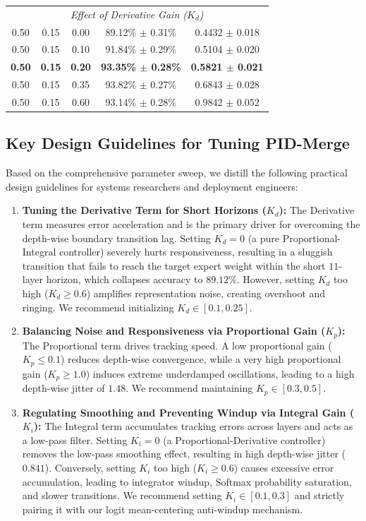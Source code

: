 \begin{table}[h]
\begin{center}
\begin{small}
\begin{sc}
\begin{tabular}{ccccc}
\midrule
\multicolumn{5}{c}{\textit{Effect of Derivative Gain ($K_d$)}} \\
0.50 & 0.15 & 0.00 & 89.12\% $\pm$ 0.31\% & 0.4432 $\pm$ 0.018 \\
0.50 & 0.15 & 0.10 & 91.84\% $\pm$ 0.29\% & 0.5104 $\pm$ 0.020 \\
\textbf{0.50} & \textbf{0.15} & \textbf{0.20} & \textbf{93.35\% $\pm$ 0.28\%} & \textbf{0.5821 $\pm$ 0.021} \\
0.50 & 0.15 & 0.35 & 93.82\% $\pm$ 0.27\% & 0.6843 $\pm$ 0.028 \\
0.50 & 0.15 & 0.60 & 93.14\% $\pm$ 0.28\% & 0.9842 $\pm$ 0.052 \\
\bottomrule
\end{tabular}
\end{sc}
\end{small}
\end{center}
\vskip -0.1in
\end{table}

\subsection{Key Design Guidelines for Tuning PID-Merge}
Based on the comprehensive parameter sweep, we distill the following practical design guidelines for systems researchers and deployment engineers:
\begin{enumerate}
    \item \textbf{Tuning the Derivative Term for Short Horizons ($K_d$):} The Derivative term measures error acceleration and is the primary driver for overcoming the depth-wise boundary transition lag. Setting $K_d = 0$ (a pure Proportional-Integral controller) severely hurts responsiveness, resulting in a sluggish transition that fails to reach the target expert weight within the short $11$-layer horizon, which collapses accuracy to $89.12\%$. However, setting $K_d$ too high ($K_d \ge 0.6$) amplifies representation noise, creating overshoot and ringing. We recommend initializing $K_d \in [0.1, 0.25]$.
    \item \textbf{Balancing Noise and Responsiveness via Proportional Gain ($K_p$):} The Proportional term drives tracking speed. A low proportional gain ($K_p \le 0.1$) reduces depth-wise convergence, while a very high proportional gain ($K_p \ge 1.0$) induces extreme underdamped oscillations, leading to a high depth-wise jitter of $1.48$. We recommend maintaining $K_p \in [0.3, 0.5]$.
    \item \textbf{Regulating Smoothing and Preventing Windup via Integral Gain ($K_i$):} The Integral term accumulates tracking errors across layers and acts as a low-pass filter. Setting $K_i = 0$ (a Proportional-Derivative controller) removes the low-pass smoothing effect, resulting in high depth-wise jitter ($0.841$). Conversely, setting $K_i$ too high ($K_i \ge 0.6$) causes excessive error accumulation, leading to integrator windup, Softmax probability saturation, and slower transitions. We recommend setting $K_i \in [0.1, 0.3]$ and strictly pairing it with our logit mean-centering anti-windup mechanism.
\end{enumerate}


